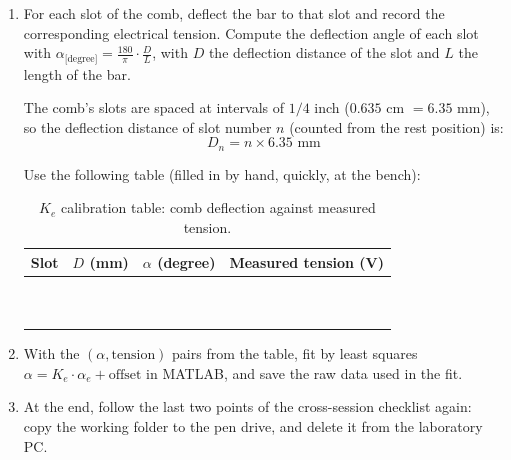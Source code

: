 \documentclass[a4paper,11pt]{article}
\begin{document}
\begin{enumerate}[label=$\square$, leftmargin=1.5em]
  \item For each slot of the comb, deflect the bar to that slot and record the
  corresponding electrical tension. Compute the deflection angle of each slot with
  $\alpha_{\text{[degree]}} = \frac{180}{\pi} \cdot \frac{D}{L}$, with $D$ the
  deflection distance of the slot and $L$ the length of the bar.

  The comb's slots are spaced at intervals of $1/4$ inch ($0.635$ cm $= 6.35$ mm),
  so the deflection distance of slot number $n$ (counted from the rest position)
  is:
  $$D_n = n \times 6.35 \text{ mm}$$

  Use the following table (filled in by hand, quickly, at the bench):

  \begin{table}[H]
    \centering
    \renewcommand{\arraystretch}{2.2}
    \begin{tabular}{|c|c|c|c|}
      \hline
      \textbf{Slot} & \textbf{$D$ (mm)} & \textbf{$\alpha$ (degree)} &
      \textbf{Measured tension (V)} \\
      \hline
       & & & \\
      \hline
       & & & \\
      \hline
       & & & \\
      \hline
       & & & \\
      \hline
       & & & \\
      \hline
       & & & \\
      \hline
       & & & \\
      \hline
       & & & \\
      \hline
       & & & \\
      \hline
       & & & \\
      \hline
    \end{tabular}
    \caption{$K_e$ calibration table: comb deflection against measured tension.}
  \end{table}

  \item With the $(\alpha, \text{tension})$ pairs from the table, fit by least
  squares $\alpha = K_e \cdot \alpha_e + \text{offset}$ in MATLAB, and save the
  raw data used in the fit.

  \item At the end, follow the last two points of the cross-session checklist
  again: copy the working folder to the pen drive, and delete it from the
  laboratory PC.
\end{enumerate}
\end{document}
